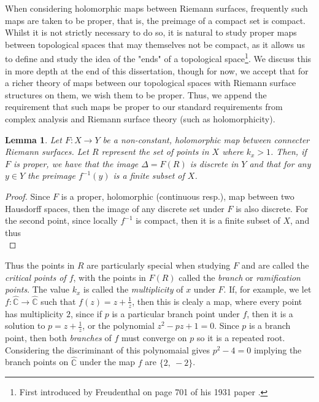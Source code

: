\documentclass[11pt]{report}
\newtheorem{lemma}[thm]{Lemma}
\theoremstyle{definition}
\begin{document}
When considering holomorphic maps between Riemann surfaces, frequently such maps are taken to be proper, that is, the preimage of a compact set is compact. Whilst it is not strictly necessary to do so, it is natural to study proper maps between topological spaces that may themselves not be compact, as it allows us to define and study the idea of the "ends" of a topological space\footnote{First introduced by Freudenthal on page 701 of his 1931 paper \cite{freudenthal}.}. We discuss this in more depth at the end of this dissertation, though for now, we accept that for a richer theory of maps between our topological spaces with Riemann surface structures on them, we wish them to be proper. Thus, we append the requirement that such maps be proper to our standard requirements from complex analysis and Riemann surface theory (such as holomorphicity). 

\begin{lemma}
  Let $F:X \rightarrow Y$ be a non-constant, holomorphic map between connecter Riemann surfaces. Let $R$ represent the set of points in $X$ where $k_x > 1$. Then, if $F$ is proper, we have that the image $\Delta = F(R)$ is discrete in $Y$ and that for any $y \in Y$ the preimage $f^{-1}(y)$ is a finite subset of $X$.
\end{lemma}
\begin{proof}
  Since $F$ is a proper, holomorphic (continuous resp.), map between two Hausdorff spaces, then the image of any discrete set under $F$ is also discrete. For the second point, since locally $f^{-1}$ is compact, then it is a finite subset of $X$, and thus ~\\
\end{proof}

Thus the points in $R$ are particularly special when studying $F$ and are called the \emph{critical points of $f$}, with the points in $F(R)$ called the \emph{branch} or \emph{ramification points}. The value $k_x$ is called the \emph{multiplicity} of $x$ under $F$. If, for example, we let $f:\widehat{\mathbb{C}}\rightarrow \widehat{\mathbb{C}}$ such that $f(z) = z + \frac{1}{z}$, then this is clealy a map, where every point has multiplicity $2$, since if $p$ is a particular branch point under $f$, then it is a solution to $p=z + \frac{1}{z}$, or the polynomial $z^2 -pz + 1=0$. Since $p$ is a branch point, then both \emph{branches} of $f$ must converge on $p$ so it is a repeated root. Considering the discriminant of this polynomaial gives $p^2 - 4 = 0$ implying the branch points on $\widehat{\mathbb{C}}$ under the map $f$ are $\{2,\ -2\}$.
\end{document}
